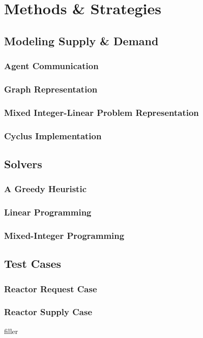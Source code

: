\section{Methods \& Strategies}

\subsection{Modeling Supply \& Demand}

\subsubsection{Agent Communication}


\subsubsection{Graph Representation}


\subsubsection{Mixed Integer-Linear Problem Representation}

\subsubsection{Cyclus Implementation}


\subsection{Solvers}

\subsubsection{A Greedy Heuristic}

\subsubsection{Linear Programming}


\subsubsection{Mixed-Integer Programming}


\subsection{Test Cases}

\subsubsection{Reactor Request Case}

\subsubsection{Reactor Supply Case}

filler
